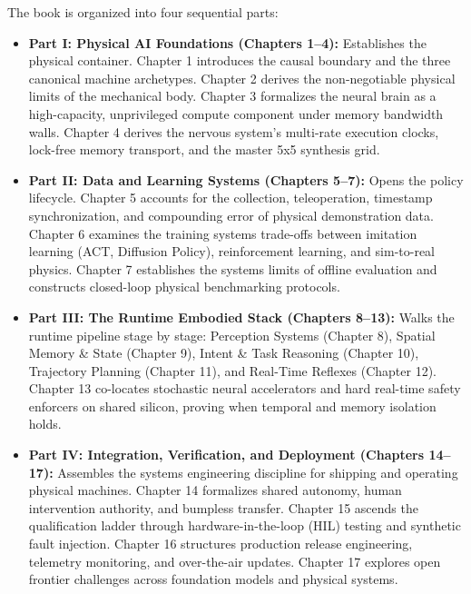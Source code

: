 \documentclass[
  10pt,
  letterpaper,
  twoside,
  openright,
  numbers=noenddot,
  headings=standardclasses
]{scrbook}
\begin{document}

The book is organized into four sequential parts:

\begin{itemize}
\tightlist
\item
  \textbf{Part I: Physical AI Foundations (Chapters 1--4):} Establishes
  the physical container. Chapter 1 introduces the causal boundary and
  the three canonical machine archetypes. Chapter 2 derives the
  non-negotiable physical limits of the mechanical body. Chapter 3
  formalizes the neural brain as a high-capacity, unprivileged compute
  component under memory bandwidth walls. Chapter 4 derives the nervous
  system's multi-rate execution clocks, lock-free memory transport, and
  the master 5x5 synthesis grid.
\item
  \textbf{Part II: Data and Learning Systems (Chapters 5--7):} Opens the
  policy lifecycle. Chapter 5 accounts for the collection,
  teleoperation, timestamp synchronization, and compounding error of
  physical demonstration data. Chapter 6 examines the training systems
  trade-offs between imitation learning (ACT, Diffusion Policy),
  reinforcement learning, and sim-to-real physics. Chapter 7 establishes
  the systems limits of offline evaluation and constructs closed-loop
  physical benchmarking protocols.
\item
  \textbf{Part III: The Runtime Embodied Stack (Chapters 8--13):} Walks
  the runtime pipeline stage by stage: Perception Systems (Chapter 8),
  Spatial Memory \& State (Chapter 9), Intent \& Task Reasoning (Chapter
  10), Trajectory Planning (Chapter 11), and Real-Time Reflexes (Chapter
  12). Chapter 13 co-locates stochastic neural accelerators and hard
  real-time safety enforcers on shared silicon, proving when temporal
  and memory isolation holds.
\item
  \textbf{Part IV: Integration, Verification, and Deployment (Chapters
  14--17):} Assembles the systems engineering discipline for shipping
  and operating physical machines. Chapter 14 formalizes shared
  autonomy, human intervention authority, and bumpless transfer. Chapter
  15 ascends the qualification ladder through hardware-in-the-loop (HIL)
  testing and synthetic fault injection. Chapter 16 structures
  production release engineering, telemetry monitoring, and over-the-air
  updates. Chapter 17 explores open frontier challenges across
  foundation models and physical systems.
\end{itemize}
\end{document}
